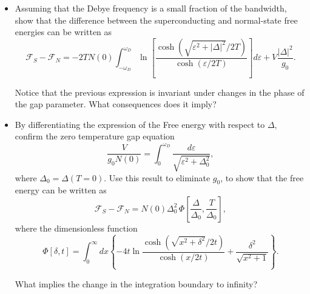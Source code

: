 \begin{Problem}

\begin{itemize}
\item Assuming that the Debye frequency is a small fraction of the bandwidth, show that the difference between the superconducting and normal-state free energies can be written as
\begin{equation}
\mathcal{F}_S - \mathcal{F}_N =
-2T N(0) \int_{-\omega_D}^{\omega_D}
\ln\!\left[
\frac{\cosh\!\left(\sqrt{\varepsilon^2+|\Delta|^2}/2T\right)}
{\cosh(\varepsilon/2T)}
\right] d\varepsilon
+ V \frac{|\Delta|^2}{g_0}.
\end{equation}

Notice that the previous expression is invariant under changes in the phase of the gap parameter. What consequences does it imply?

\item By differentiating the expression of the Free energy with respect to $\Delta$, confirm the zero temperature gap equation
\begin{equation}
\frac{V}{g_0 N(0)} =
\int_0^{\omega_D} \frac{d\varepsilon}{\sqrt{\varepsilon^2+\Delta_0^2}},
\end{equation}
where $\Delta_0 = \Delta(T = 0)$. Use this result to eliminate $g_0$, to show that the free energy can be written as
\begin{equation}
\mathcal{F}_S - \mathcal{F}_N =
N(0)\Delta_0^2\,
\Phi\!\left[\frac{\Delta}{\Delta_0},\frac{T}{\Delta_0}\right],
\end{equation}
where the dimensionless function
\begin{equation}
\Phi[\delta,t] =
\int_0^\infty dx
\left\{
-4t \ln
\frac{\cosh\!\left(\sqrt{x^2+\delta^2}/2t\right)}
{\cosh(x/2t)}
+ \frac{\delta^2}{\sqrt{x^2+1}}
\right\}.
\end{equation}

What implies the change in the integration boundary to infinity?
\end{itemize}
\end{Problem}
